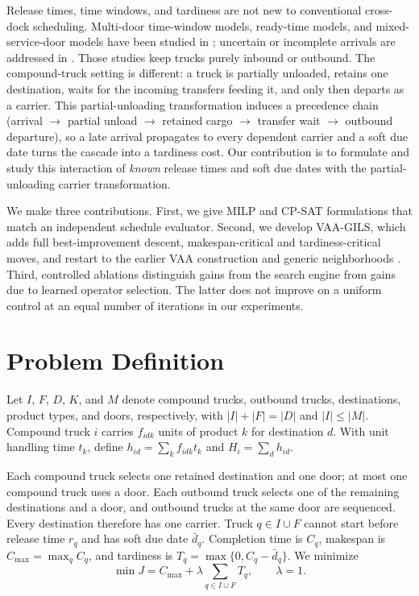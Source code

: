 \documentclass[11pt,a4paper]{article}
\begin{document}
Release times, time windows, and tardiness are not new to conventional
cross-dock scheduling. Multi-door time-window models, ready-time models, and
mixed-service-door models have been studied in
\cite{vanbelle2013,assadi2016,bodnar2017,molavi2018,rijal2019,li2026}; uncertain or
incomplete arrivals are addressed in
\cite{larbi2011,konur2013,konurcost2013,ladier2016,xi2020}.
Those studies keep trucks purely inbound or outbound. The compound-truck
setting is different: a truck is partially unloaded, retains one destination,
waits for the incoming transfers feeding it, and only then departs as a carrier.
This partial-unloading transformation induces a precedence chain
(arrival $\to$ partial unload $\to$ retained cargo $\to$ transfer wait $\to$
outbound departure), so a late arrival propagates to every dependent carrier and
a soft due date turns the cascade into a tardiness cost. Our contribution is to
formulate and study this interaction of \emph{known} release times and soft due
dates with the partial-unloading carrier transformation.

We make three contributions. First, we give MILP and CP-SAT formulations that
match an independent schedule evaluator. Second, we develop VAA-GILS, which
adds full best-improvement descent, makespan-critical and tardiness-critical
moves, and restart to the earlier VAA construction and generic neighborhoods
\cite{shahmardan2020}. Third, controlled ablations distinguish gains from the
search engine from gains due to learned operator selection. The latter does
not improve on a uniform control at an equal number of iterations in our experiments.

\section{Problem Definition}

Let $I$, $F$, $D$, $K$, and $M$ denote compound trucks, outbound trucks,
destinations, product types, and doors, respectively, with
$|I|+|F|=|D|$ and $|I|\le |M|$. Compound truck $i$ carries $f_{idk}$ units of
product $k$ for destination $d$. With unit handling time $t_k$, define
$h_{id}=\sum_k f_{idk}t_k$ and $H_i=\sum_d h_{id}$.

Each compound truck selects one retained destination and one door; at most one
compound truck uses a door. Each outbound truck selects one of the remaining
destinations and a door, and outbound trucks at the same door are sequenced.
Every destination therefore has one carrier. Truck $q\in I\cup F$ cannot start
before release time $r_q$ and has soft due date $\bar d_q$. Completion time is
$C_q$, makespan is $C_{\max}=\max_q C_q$, and tardiness is
$T_q=\max\{0,C_q-\bar d_q\}$. We minimize
\begin{equation}
 \min J=C_{\max}+\lambda\sum_{q\in I\cup F}T_q, \qquad \lambda=1.
 \label{eq:objective}
\end{equation}
\end{document}
